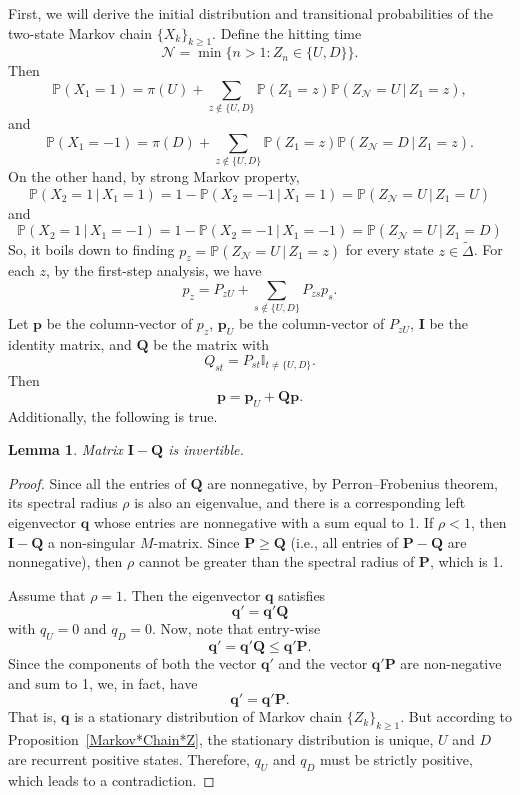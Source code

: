 \documentclass{amsart}
\newtheorem{Lemma}{Lemma}
\newcommand{\N}{{\mathcal{N}}}
\newcommand{\PP}{{\mathbb{P}}}
\newcommand{\I}{{\mathbb{I}}}
\newcommand{\1}{{\mathbf{1}}}
\newcommand{\gv}{\,|\,}
\begin{document}
First, we will derive the initial distribution and transitional probabilities of the two-state Markov
chain  $\{X_k\}_{k\geq 1}$.  Define the hitting time
\[
 \N = \min\{n>1: Z_n\in\{U,D\}\}.
\]
Then
\[
  \PP(X_1=1)
  =
  \pi(U) + \sum_{z\notin \{U,D\}} \PP(Z_1=z) \PP(Z_\N=U\gv Z_1=z),
\]
and
\[
  \PP(X_1=-1)
  =
  \pi(D) + \sum_{z\notin \{U,D\}} \PP(Z_1=z)\PP(Z_\N=D\gv Z_1=z).
\]
On the other hand, by strong Markov property,
\[
  \PP(X_2=1\gv X_1=1) =
  1 - \PP(X_2=-1\gv X_1=1)=\PP(Z_\N=U\gv Z_1=U)
\]
and
\[
  \PP(X_2=1\gv X_1=-1)=
  1 - \PP(X_2=-1\gv X_1=-1)=\PP(Z_\N=U\gv Z_1=D)
\]
So, it boils down to finding $p_z=\PP(Z_\N = U \gv Z_1=z)$ for every state $z\in \tilde{\Delta}$. For each $z$, by the first-step
analysis, we  have
\[
  p_z = P_{zU} + \sum_{s\notin \{U,D\}} P_{zs} p_s.
\]
Let $\mathbf{p}$ be the column-vector of $p_z$,  $\mathbf{p}_U$ be the column-vector of $P_{zU}$, $\mathbf{I}$ be the identity matrix, and $\mathbf{Q}$ be the matrix with
$$Q_{st} = P_{st} \I_{t\ne \{U,D\}}.$$
Then $$\mathbf{p} = \mathbf{p}_U + \mathbf{Q} \mathbf{p}.$$ Additionally, the following is true.
\begin{Lemma} Matrix $\mathbf{I}-\mathbf{Q}$ is invertible.
\end{Lemma}
\begin{proof}
Since all the entries of $\mathbf{Q}$ are nonnegative, by Perron--Frobenius theorem,
its spectral radius $\rho$ is also an eigenvalue, and there is a corresponding
left eigenvector $\mathbf{q}$ whose entries are nonnegative with a sum equal to 1.
If $\rho<1$, then $\mathbf{I}-\mathbf{Q}$ a non-singular $M$-matrix.
Since $\mathbf{P}\ge \mathbf{Q}$ (i.e., all entries of $\mathbf{P}-\mathbf{Q}$ are
nonnegative), then $\rho$ cannot be greater than the spectral radius of $\mathbf{P}$, which is 1.

Assume that  $\rho=1$.  Then the eigenvector $\mathbf{q}$ satisfies
\[
    \mathbf{q}' = \mathbf{q}'\mathbf{Q}
\]
with $q_U=0$ and $q_D=0$.
Now, note that entry-wise
\[
    \mathbf{q}' = \mathbf{q}'\mathbf{Q}\leq \mathbf{q}'\mathbf{P}.
\]
Since the components of both the vector $\mathbf{q}'$ and the vector $\mathbf{q}' \mathbf{P}$
are non-negative and sum to 1, we, in fact, have
\[
    \mathbf{q}' = \mathbf{q}'\mathbf{P}.
\]
That is, $\mathbf{q}$ is a stationary distribution of Markov chain $\{Z_k\}_{k\geq 1}$.
But according to Proposition~\ref{Markov*Chain*Z}, the stationary distribution
is unique, $U$ and $D$ are recurrent positive states. Therefore, $q_U$ and $q_D$ must be
strictly positive, which leads to a contradiction.
\end{proof}
\end{document}
